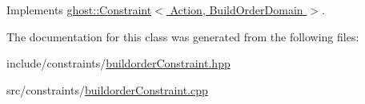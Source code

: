 Implements \hyperlink{classghost_1_1Constraint_a8dd05c04dbce51e88a6301e9332fb2f5}{ghost\-::\-Constraint$<$ Action, Build\-Order\-Domain $>$}.



The documentation for this class was generated from the following files\-:\begin{DoxyCompactItemize}
\item 
include/constraints/\hyperlink{buildorderConstraint_8hpp}{buildorder\-Constraint.\-hpp}\item 
src/constraints/\hyperlink{buildorderConstraint_8cpp}{buildorder\-Constraint.\-cpp}\end{DoxyCompactItemize}
